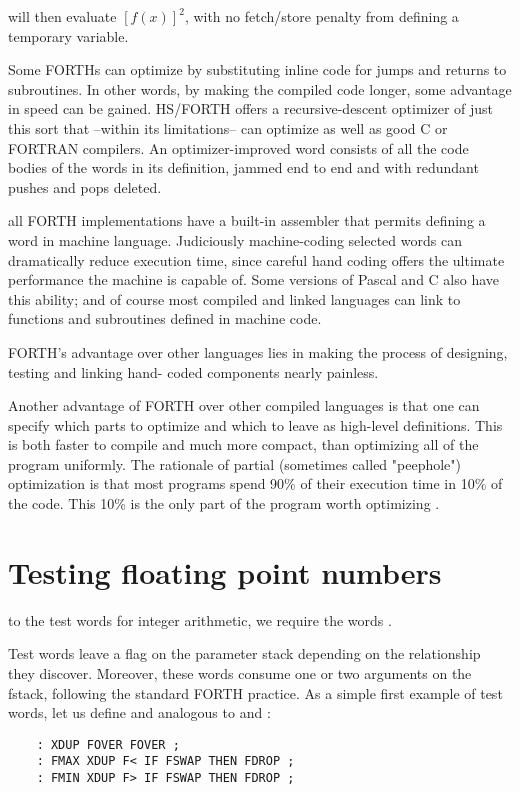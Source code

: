 will then evaluate $[f(x)]^2$, with no fetch/store penalty from defining
a temporary variable.

Some FORTHs can optimize by substituting inline code for jumps
and returns to subroutines. In other words, by making the compiled code longer,
some advantage in speed can be gained.
HS/FORTH offers a recursive-descent optimizer of just this sort
that --within its limitations-- can optimize as well as good C or
FORTRAN compilers. An optimizer-improved word consists of
all the code bodies of the words in its definition, jammed end to
end and with redundant pushes and pops deleted.

all FORTH implementations have a built-in assembler that permits defining a word in machine language. Judiciously machine-coding selected words can dramatically reduce execution time, since careful hand coding offers the ultimate performance the machine is capable of. Some versions of Pascal and C also have this ability; and of course most compiled and linked languages can link to functions and subroutines defined in machine code.

FORTH's advantage over other languages lies in making the 
process of designing, testing and linking hand- coded components
nearly painless.

Another advantage of FORTH over other compiled languages is
that one can specify which parts to optimize and which to leave
as high-level definitions. This is both faster to compile and much
more compact, than optimizing all of the program uniformly. The
rationale of partial (sometimes called "peephole") optimization
is that most programs spend 90\% of their execution time in 10\%
of the code. This 10\% is the only part of the program worth
optimizing  .

\section{Testing floating point numbers}

to the test words for integer arithmetic, we require the words .

Test words leave a flag on the parameter stack depending on the relationship they discover. Moreover, these words consume one or two arguments on the fstack, following the standard FORTH practice. As a simple first example of test words, let us define
 and  analogous to  and :
\begin{lstlisting}
    : XDUP FOVER FOVER ;
    : FMAX XDUP F< IF FSWAP THEN FDROP ;
    : FMIN XDUP F> IF FSWAP THEN FDROP ;
\end{lstlisting}

